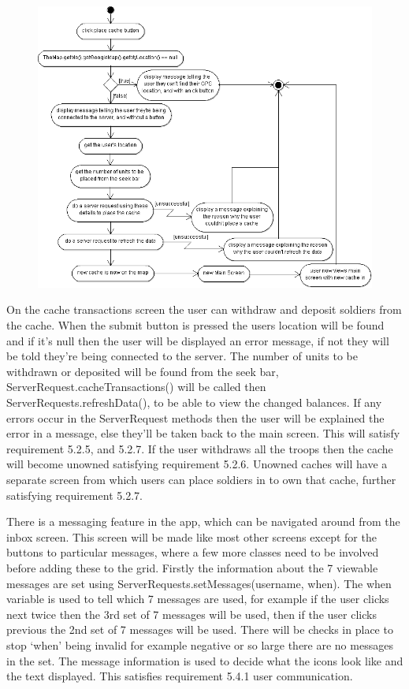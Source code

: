 \newpage
\begin{figure}
    \centering
    \includegraphics[width=\textwidth]{images/activity/placeCache}
\end{figure}

On the cache transactions screen the user can withdraw and deposit soldiers from the cache. When the submit button is pressed the users location will be found and if it's null then the user will be displayed an error message, if not they will be told they're being connected to the server. The number of units to be withdrawn or deposited will be found from the seek bar, ServerRequest.cacheTransactions() will be called then ServerRequests.refreshData(), to be able to view the changed balances. If any errors occur in the ServerRequest methods then the user will be explained the error in a message, else they'll be taken back to the main screen. This will satisfy requirement 5.2.5, and 5.2.7. If the user withdraws all the troops then the cache will become unowned satisfying requirement 5.2.6. Unowned caches will have a separate screen from which users can place soldiers in to own that cache, further satisfying requirement 5.2.7.

There is a messaging feature in the app, which can be navigated around from the inbox screen. This screen will be made like most other screens except for the buttons to particular messages, where a few more classes need to be involved before adding these to the grid. Firstly the information about the 7 viewable messages are set using ServerRequests.setMessages(username, when). The when variable is used to tell which 7 messages are used, for example if the user clicks next twice then the 3rd set of 7 messages will be used, then if the user clicks previous the 2nd set of 7 messages will be used. There will be checks in place to stop `when' being invalid for example negative or so large there are no messages in the set. The message information is used to decide what the icons look like and the text displayed. This satisfies requirement 5.4.1 user communication.


